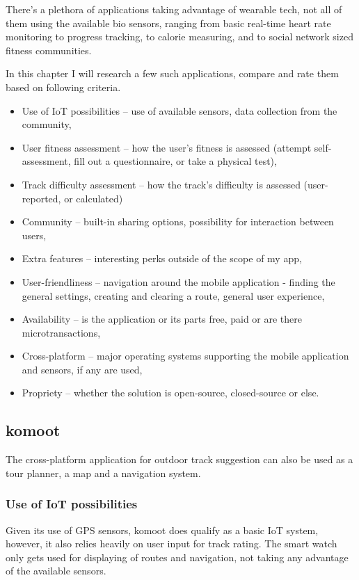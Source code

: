 There's a plethora of applications taking advantage of wearable tech, not all of them using the available bio sensors, ranging from basic real-time heart rate monitoring to progress tracking, to calorie measuring, and to social network sized fitness communities.

In this chapter I will research a few such applications, compare and rate them based on following criteria. 
\begin{itemize}
    \item Use of IoT possibilities -- use of available sensors, data collection from the community,
    \item User fitness assessment -- how the user's fitness is assessed (attempt self-assessment, fill out a questionnaire, or take a physical test),
    \item Track difficulty assessment -- how the track's difficulty is assessed (user-reported, or calculated)
    \item Community -- built-in sharing options, possibility for interaction between users,
    \item Extra features -- interesting perks outside of the scope of my app,
    \item User-friendliness -- navigation around the mobile application - finding the general settings, creating and clearing a route, general user experience,
    \item Availability -- is the application or its parts free, paid or are there microtransactions,
    \item Cross-platform -- major operating systems supporting the mobile application and sensors, if any are used,
    \item Propriety -- whether the solution is open-source, closed-source or else.
\end{itemize}

\subsection{komoot}
The cross-platform application for outdoor track suggestion can also be used as a tour planner, a map and a navigation system.


\subsubsection*{Use of IoT possibilities}
Given its use of GPS sensors, komoot does qualify as a basic IoT system, however, it also relies heavily on user input for track rating.
The smart watch only gets used for displaying of routes and navigation, not taking any advantage of the available sensors.
